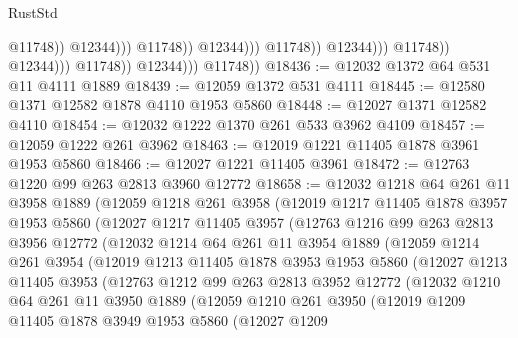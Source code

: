 \begin{lexlean}{RustStd}
\begin{coremodule}
{\begin{coremodule}
{{{{{{{{{{{{{{{{{{{{{{{{{{{{{                                                          @11748))
                                                      @12344)))
                                                @11748))
                                            @12344)))
                                      @11748))
                                  @12344)))
                            @11748))
                        @12344)))
                  @11748))
              @12344)))
        @11748))
@18436 := @12032 @1372 @64 @531 @11 @4111 @1889
@18439 := @12059 @1372 @531 @4111
@18445 := @12580 @1371 @12582 @1878 @4110 @1953 @5860
@18448 := @12027 @1371 @12582 @4110
@18454 := @12032 @1222 @1370 @261 @533 @3962 @4109
@18457 := @12059 @1222 @261 @3962
@18463 := @12019 @1221 @11405 @1878 @3961 @1953 @5860
@18466 := @12027 @1221 @11405 @3961
@18472 := @12763 @1220 @99 @263 @2813 @3960 @12772
@18658 := @12032
    @1218
    @64
    @261
    @11
    @3958
    @1889
    (@12059
      @1218
      @261
      @3958
      (@12019
        @1217
        @11405
        @1878
        @3957
        @1953
        @5860
        (@12027
          @1217
          @11405
          @3957
          (@12763
            @1216
            @99
            @263
            @2813
            @3956
            @12772
            (@12032
              @1214
              @64
              @261
              @11
              @3954
              @1889
              (@12059
                @1214
                @261
                @3954
                (@12019
                  @1213
                  @11405
                  @1878
                  @3953
                  @1953
                  @5860
                  (@12027
                    @1213
                    @11405
                    @3953
                    (@12763
                      @1212
                      @99
                      @263
                      @2813
                      @3952
                      @12772
                      (@12032
                        @1210
                        @64
                        @261
                        @11
                        @3950
                        @1889
                        (@12059
                          @1210
                          @261
                          @3950
                          (@12019
                            @1209
                            @11405
                            @1878
                            @3949
                            @1953
                            @5860
                            (@12027
                              @1209
}}}}}}}}}}}}}}}}}}}}}}}}}}}}}
\end{coremodule}}
\end{coremodule}
\end{lexlean}
